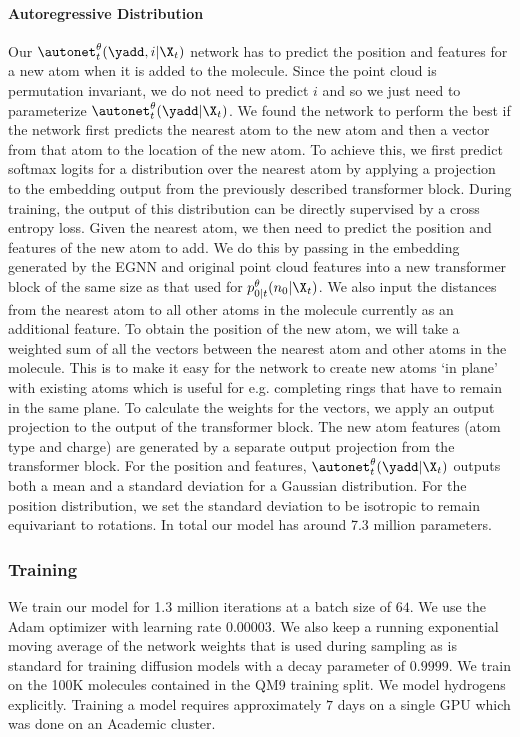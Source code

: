 \paragraph{Autoregressive Distribution}
Our $\autonet_t^\theta(\yadd, i | \X_t)$ network has to predict the position and features for a new atom when it is added to the molecule. Since the point cloud is permutation invariant, we do not need to predict $i$ and so we just need to parameterize $\autonet_t^\theta(\yadd | \X_t)$. We found the network to perform the best if the network first predicts the nearest atom to the new atom and then a vector from that atom to the location of the new atom. To achieve this, we first predict softmax logits for a distribution over the nearest atom by applying a projection to the embedding output from the previously described transformer block. During training, the output of this distribution can be directly supervised by a cross entropy loss. Given the nearest atom, we then need to predict the position and features of the new atom to add. We do this by passing in the embedding generated by the EGNN and original point cloud features into a new transformer block of the same size as that used for $p_{0|t}^\theta(n_0 | \X_t)$. We also input the distances from the nearest atom to all other atoms in the molecule currently as an additional feature. To obtain the position of the new atom, we will take a weighted sum of all the vectors between the nearest atom and other atoms in the molecule. This is to make it easy for the network to create new atoms `in plane' with existing atoms which is useful for e.g. completing rings that have to remain in the same plane. To calculate the weights for the vectors, we apply an output projection to the output of the transformer block. The new atom features (atom type and charge) are generated by a separate output projection from the transformer block. For the position and features, $\autonet_t^\theta(\yadd | \X_t)$ outputs both a mean and a standard deviation for a Gaussian distribution. For the position distribution, we set the standard deviation to be isotropic to remain equivariant to rotations. In total our model has around 7.3 million parameters.

\subsubsection{Training}
We train our model for 1.3 million iterations at a batch size of $64$. We use the Adam optimizer with learning rate $0.00003$. We also keep a running exponential moving average of the network weights that is used during sampling as is standard for training diffusion models \cite{ho2020denoising, song2020score, karraselucidating2022} with a decay parameter of $0.9999$. We train on the 100K molecules contained in the QM9 training split. We model hydrogens explicitly. Training a model requires approximately $7$ days on a single GPU which was done on an Academic cluster.

